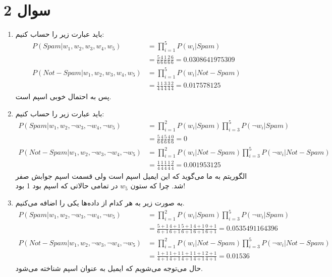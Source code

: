 \section*{سوال 2}
\begin{enumerate}
    \item باید عبارت زیر را حساب کنیم:
    \begin{align*}
        P(Spam | w_1, w_2, w_3, w_4, w_5) &= \prod_{i=1}^5 P(w_i | Spam)\\
        &= \frac{5}{6} \frac{4}{6} \frac{1}{6} \frac{2}{6} \frac{6}{6} = 0.0308641975309\\
        P(Not-Spam | w_1, w_2, w_3, w_4, w_5) &= \prod_{i=1}^5 P(w_i | Not-Spam)\\
        &= \frac{1}{4} \frac{1}{4} \frac{3}{4} \frac{3}{4} \frac{2}{4} = 0.017578125
    \end{align*}
    پس به احتمال خوبی اسپم است.
    \item باید عبارت زیر را حساب کنیم:
    \begin{align*}
        P(Spam | w_1, w_2, \neg w_3, \neg w_4, \neg w_5) &= \prod_{i=1}^2 P(w_i | Spam) \prod_{i=3}^5 P(\neg w_i | Spam)\\
        &= \frac{5}{6} \frac{4}{6} \frac{5}{6} \frac{4}{6} \frac{0}{6} = 0\\
        P(Not-Spam | w_1, w_2, \neg w_3, \neg w_4, \neg w_5) &= \prod_{i=1}^2 P(w_i | Not-Spam) \prod_{i=3}^5 P(\neg w_i | Not-Spam)\\
        &= \frac{1}{4} \frac{1}{4} \frac{1}{4} \frac{1}{4} \frac{2}{4} = 0.001953125
    \end{align*}
    الگوریتم به ما می‌گوید که این ایمیل اسپم است ولی قسمت اسپم جوابش صفر شد. چرا که ستون
    $w_5$
    در تمامی حالاتی که اسپم بود 1 بود!
    \item به صورت زیر به هر کدام از داده‌ها یکی را اضافه می‌کنیم.
    \begin{align*}
        P(Spam | w_1, w_2, \neg w_3, \neg w_4, \neg w_5) &= \prod_{i=1}^2 P(w_i | Spam) \prod_{i=3}^5 P(\neg w_i | Spam)\\
        &= \frac{5+1}{6+1} \frac{4+1}{6+1} \frac{5+1}{6+1} \frac{4+1}{6+1} \frac{0+1}{6+1} = 0.0535491164396\\
        P(Not-Spam | w_1, w_2, \neg w_3, \neg w_4, \neg w_5) &= \prod_{i=1}^2 P(w_i | Not-Spam) \prod_{i=3}^5 P(\neg w_i | Not-Spam)\\
        &= \frac{1+1}{4+1} \frac{1+1}{4+1} \frac{1+1}{4+1} \frac{1+1}{4+1} \frac{2+1}{4+1} = 0.01536
    \end{align*}
    حال می‌توجه می‌شویم که ایمیل به عنوان اسپم شناخته می‌شود.
\end{enumerate}